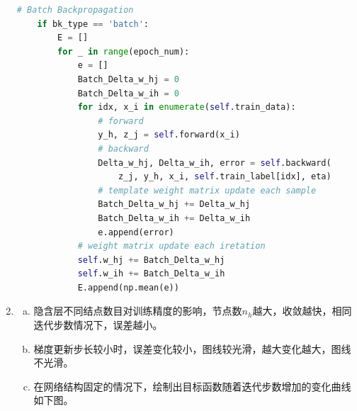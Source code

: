 \documentclass[a4paper,11pt,onecolumn,oneside,UTF8]{article}
\begin{document}
\begin{enumerate}
\begin{lstlisting}[language=Python]
    # Batch Backpropagation
    if bk_type == 'batch':
        E = []
        for _ in range(epoch_num):
            e = []
            Batch_Delta_w_hj = 0
            Batch_Delta_w_ih = 0
            for idx, x_i in enumerate(self.train_data):
                # forward
                y_h, z_j = self.forward(x_i)
                # backward
                Delta_w_hj, Delta_w_ih, error = self.backward(
                    z_j, y_h, x_i, self.train_label[idx], eta)
                # template weight matrix update each sample
                Batch_Delta_w_hj += Delta_w_hj
                Batch_Delta_w_ih += Delta_w_ih
                e.append(error)
            # weight matrix update each iretation
            self.w_hj += Batch_Delta_w_hj
            self.w_ih += Batch_Delta_w_ih
            E.append(np.mean(e))
    \end{lstlisting}
    \item
          \begin{enumerate}[(a)]
              \item 隐含层不同结点数目对训练精度的影响，节点数$n_h$越大，收敛越快，相同迭代步数情况下，误差越小。
              \item 梯度更新步长较小时，误差变化较小，图线较光滑，越大变化越大，图线不光滑。
              \item 在网络结构固定的情况下，绘制出目标函数随着迭代步数增加的变化曲线如下图。
          \end{enumerate}
\end{enumerate}
\end{document}
